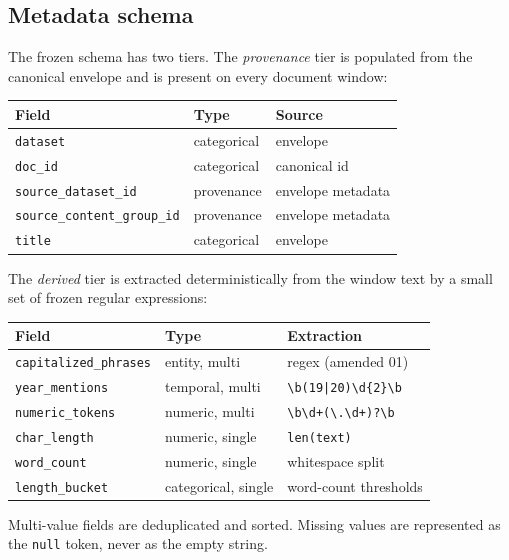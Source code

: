 \documentclass[11pt,a4paper]{article}
\begin{document}
\subsection{Metadata schema}
The frozen schema has two tiers. The \emph{provenance} tier is
populated from the canonical envelope and is present on every
document window:

\begin{center}
\small
\begin{tabular}{lll}
\toprule
\textbf{Field} & \textbf{Type} & \textbf{Source} \\
\midrule
\texttt{dataset} & categorical & envelope \\
\texttt{doc\_id} & categorical & canonical id \\
\texttt{source\_dataset\_id} & provenance & envelope metadata \\
\texttt{source\_content\_group\_id} & provenance & envelope metadata \\
\texttt{title} & categorical & envelope \\
\bottomrule
\end{tabular}
\end{center}

The \emph{derived} tier is extracted deterministically from the
window text by a small set of frozen regular expressions:

\begin{center}
\small
\begin{tabular}{lll}
\toprule
\textbf{Field} & \textbf{Type} & \textbf{Extraction} \\
\midrule
\texttt{capitalized\_phrases} & entity, multi & regex (amended 01) \\
\texttt{year\_mentions} & temporal, multi & \texttt{\textbackslash b(19|20)\textbackslash d\{2\}\textbackslash b} \\
\texttt{numeric\_tokens} & numeric, multi & \texttt{\textbackslash b\textbackslash d+(\textbackslash .\textbackslash d+)?\textbackslash b} \\
\texttt{char\_length} & numeric, single & \texttt{len(text)} \\
\texttt{word\_count} & numeric, single & whitespace split \\
\texttt{length\_bucket} & categorical, single & word-count thresholds \\
\bottomrule
\end{tabular}
\end{center}

Multi-value fields are deduplicated and sorted. Missing values are
represented as the \texttt{null} token, never as the empty string.
\end{document}
